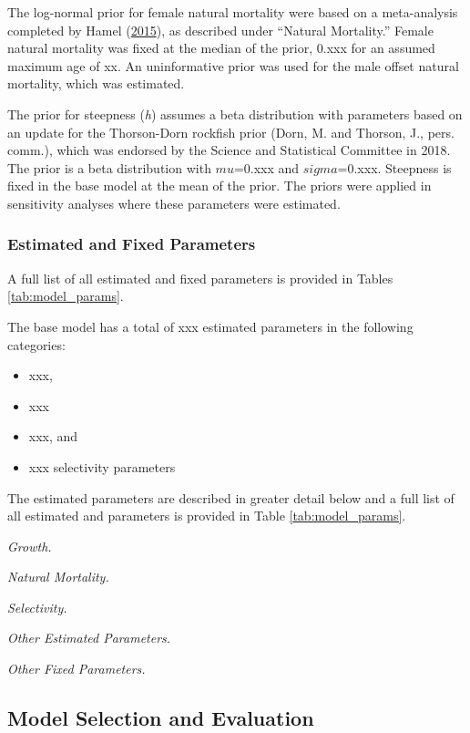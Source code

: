 \documentclass[12pt,]{article}
\begin{document}
The log-normal prior for female natural mortality were based on a
meta-analysis completed by Hamel
(\protect\hyperlink{ref-Hamel2015}{2015}), as described under ``Natural
Mortality.'' Female natural mortality was fixed at the median of the
prior, 0.xxx for an assumed maximum age of xx. An uninformative prior
was used for the male offset natural mortality, which was estimated.

The prior for steepness (\emph{h}) assumes a beta distribution with
parameters based on an update for the Thorson-Dorn rockfish prior (Dorn,
M. and Thorson, J., pers. comm.), which was endorsed by the Science and
Statistical Committee in 2018. The prior is a beta distribution with
\(mu\)=0.xxx and \(sigma\)=0.xxx. Steepness is fixed in the base model
at the mean of the prior. The priors were applied in sensitivity
analyses where these parameters were estimated.

\hypertarget{estimated-and-fixed-parameters}{%
\subsubsection{Estimated and Fixed
Parameters}\label{estimated-and-fixed-parameters}}

A full list of all estimated and fixed parameters is provided in Tables
\ref{tab:model_params}.

The base model has a total of xxx estimated parameters in the following
categories:

\begin{itemize}
  \item xxx,
  \item xxx
  \item xxx, and
  \item xxx selectivity parameters
\end{itemize}

The estimated parameters are described in greater detail below and a
full list of all estimated and parameters is provided in Table
\ref{tab:model_params}.

\emph{Growth.}

\emph{Natural Mortality.}

\emph{Selectivity.}

\emph{Other Estimated Parameters.}

\emph{Other Fixed Parameters.}

\hypertarget{model-selection-and-evaluation}{%
\subsection{Model Selection and
Evaluation}\label{model-selection-and-evaluation}}
\end{document}
